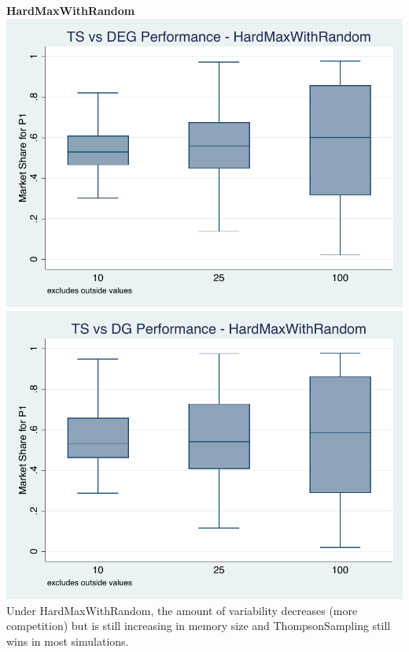 \documentclass[11pt,letterpaper]{article}
\begin{document}
\pagebreak
\textbf{HardMaxWithRandom} \\
\includegraphics[scale=0.9]{hmr_ts_deg} \\
\includegraphics[scale=0.9]{hmr_ts_dg} \\
Under HardMaxWithRandom, the amount of variability decreases (more competition) but is still increasing in memory size and ThompsonSampling still wins in most simulations.
\end{document}

